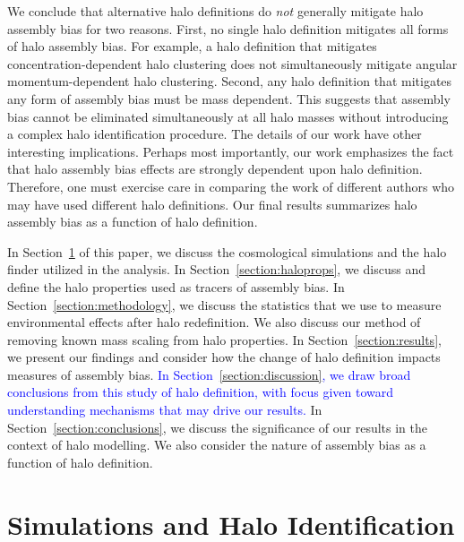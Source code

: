 \documentclass[usenatbib,fleqn]{mnras}
\begin{document}
We conclude that alternative halo definitions do {\em not} generally mitigate halo assembly bias for two reasons. First, no single halo definition mitigates all forms of halo assembly bias. For example, a halo definition that mitigates concentration-dependent halo clustering does not simultaneously mitigate angular momentum-dependent halo clustering. Second, any halo definition that mitigates any form  of assembly bias must be mass dependent. This suggests that assembly bias cannot be eliminated simultaneously at all halo masses without introducing a complex halo identification procedure. The details of our work have other interesting implications. Perhaps most importantly, our work emphasizes the fact that halo assembly bias effects are strongly dependent upon halo definition. Therefore, one must exercise care in comparing the work of different authors who may have used different halo definitions. Our final results summarizes halo assembly bias as a function of halo definition.
 
In Section~\ref{section:data} of this paper, we discuss the cosmological simulations and the halo finder utilized in the analysis. In Section~\ref{section:haloprops}, we discuss and define the halo properties used as tracers of assembly bias. In Section~\ref{section:methodology}, we discuss the statistics that we use to measure environmental effects after halo redefinition. We also discuss our method of removing known mass scaling from halo properties. In Section~\ref{section:results}, we present our findings and consider how the change of halo definition impacts measures of assembly bias. \textcolor{blue}{In Section~\ref{section:discussion}, we draw broad conclusions from this study of halo definition, with focus given toward understanding mechanisms that may drive our results.} In Section~\ref{section:conclusions}, we discuss the significance of our results in the context of halo modelling. We also consider the nature of assembly bias as a function of halo definition.

\section[]{Simulations and Halo Identification}
\label{section:data}
\end{document}
